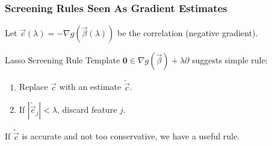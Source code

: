 \documentclass[10pt]{beamer}
\begin{document}
\begin{frame}
  \frametitle{Screening Rules Seen As Gradient Estimates}

  Let \(\vec{c}(\lambda) = -\nabla g(\vec{\beta}(\lambda))\) be the \alert{correlation}
  (negative gradient).

  \medskip

  \begin{exampleblock}{Lasso Screening Rule Template }
    \(\boldsymbol{0} \in \nabla g(\vec{\beta}) + \lambda \partial\) suggests simple rule:
    \begin{enumerate}
      \item Replace \(\vec{c}\) with an estimate \(\tilde{\vec{c}}\).
      \item If \(|\tilde{\vec{c}}_j| < \lambda\), discard feature \(j\).
    \end{enumerate}

    \medskip

    If \(\tilde{\vec{c}}\) is accurate and not too conservative, we have a useful rule.
  \end{exampleblock}
\end{frame}
\end{document}
